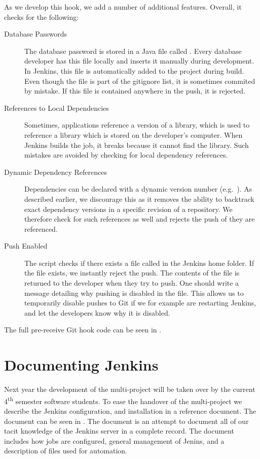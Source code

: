 As we develop this hook, we add a number of additional features. Overall, it checks for the following:
\begin{description}
  \item[Database Passwords] The database password is stored in a Java file called . Every database developer has this file locally and inserts it manually during development. In Jenkins, this file is automatically added to the project during build. Even though the file is part of the gitignore list, it is sometimes commited by mistake. If this file is contained anywhere in the push, it is rejected.
  \item[References to Local Dependencies] Sometimes, applications reference a  version of a library, which is used to reference a library which is stored on the developer's computer. When Jenkins builds the job, it breaks because it cannot find the library. Such mistakes are avoided by checking for local dependency references.
  \item[Dynamic Dependency References] Dependencies can be declared with a dynamic version number (e.g.\ ). As described earlier, we discourage this as it removes the ability to backtrack exact dependency versions in a specific revision of a repository. We therefore check for such references as well and rejects the push of they are referenced.
  \item[Push Enabled] The script checks if there exists a file called  in the Jenkins home folder. If the file exists, we instantly reject the push. The contents of the file is returned to the developer when they try to push. One should write a message detailing why pushing is disabled in the file. This allows us to temporarily disable pushes to Git if we for example are restarting Jenkins, and let the developers know why it is disabled.
\end{description}
The full pre-receive Git hook code can be seen in .

\section{Documenting Jenkins}\label{sec:jenkins_doc}
Next year the development of the multi-project will be taken over by the current 4\textsuperscript{th} semester software students. To ease the handover of the multi-project we describe the Jenkins configuration, and installation in a reference document. The document can be seen in . The document is an attempt to document all of our tacit knowledge of the Jenkins server in a complete record. The document includes how jobs are configured, general management of Jenins, and a description of files used for automation.